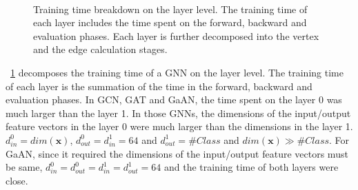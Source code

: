 \begin{figure}
    \centering
    \\
    \caption{Training time breakdown on the layer level. The training time of each layer includes the time spent on the forward, backward and evaluation phases. Each layer is further decomposed into the vertex and the edge calculation stages.}
    \label{fig:exp_vertex_edge_cal_proportion}
\end{figure}

\figurename~\ref{fig:exp_vertex_edge_cal_proportion} decomposes the training time of a GNN on the layer level.
The training time of each layer is the summation of the time in the forward, backward and evaluation phases.
In GCN, GAT and GaAN, the time spent on the layer 0 was much larger than the layer 1.
In those GNNs, the dimensions of the input/output feature vectors in the layer 0 were much larger than the dimensions in the layer 1.
$d^0_{in}=dim(\boldsymbol{x})$, $d^0_{out}=d^1_{in}=64$ and $d^1_{out}=\#Class$ and $dim(\boldsymbol{x}) \gg \#Class$.
For GaAN, since it required the dimensions of the input/output feature vectors must be same, $d^0_{in}=d^0_{out}=d^1_{in}=d^1_{out}=64$ and the training time of both layers were close.

